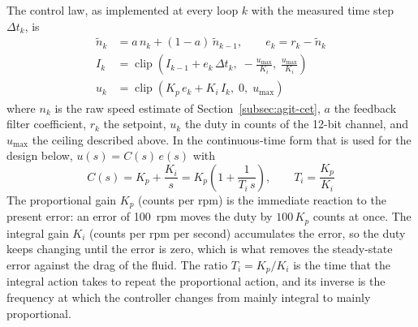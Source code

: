 The control law, as implemented at every loop $k$ with the measured time step $\Delta t_k$, is
\begin{align}
    \tilde{n}_k &= a\, n_k + (1 - a)\, \tilde{n}_{k-1}, \qquad e_k = r_k - \tilde{n}_k \label{eq:pi-fb}\\[2pt]
    I_k &= \operatorname{clip}\!\left(I_{k-1} + e_k\, \Delta t_k,\; -\frac{u_{\max}}{K_i},\; \frac{u_{\max}}{K_i}\right) \label{eq:pi-int}\\[2pt]
    u_k &= \operatorname{clip}\!\left(K_p\, e_k + K_i\, I_k,\; 0,\; u_{\max}\right) \label{eq:pi-law}
\end{align}
where $n_k$ is the raw speed estimate of Section~\ref{subsec:agit-cet}, $a$ the feedback filter coefficient, $r_k$ the setpoint, $u_k$ the duty in counts of the 12-bit channel, and $u_{\max}$ the ceiling described above. In the continuous-time form that is used for the design below, $u(s) = C(s)\,e(s)$ with
\begin{equation}
    C(s) = K_p + \frac{K_i}{s} = K_p\left(1 + \frac{1}{T_i\, s}\right), \qquad T_i = \frac{K_p}{K_i}
    \label{eq:pi-tf}
\end{equation}
The proportional gain $K_p$ (counts per rpm) is the immediate reaction to the present error: an error of 100~rpm moves the duty by $100\,K_p$ counts at once. The integral gain $K_i$ (counts per rpm per second) accumulates the error, so the duty keeps changing until the error is zero, which is what removes the steady-state error against the drag of the fluid. The ratio $T_i = K_p/K_i$ is the time that the integral action takes to repeat the proportional action, and its inverse is the frequency at which the controller changes from mainly integral to mainly proportional.

